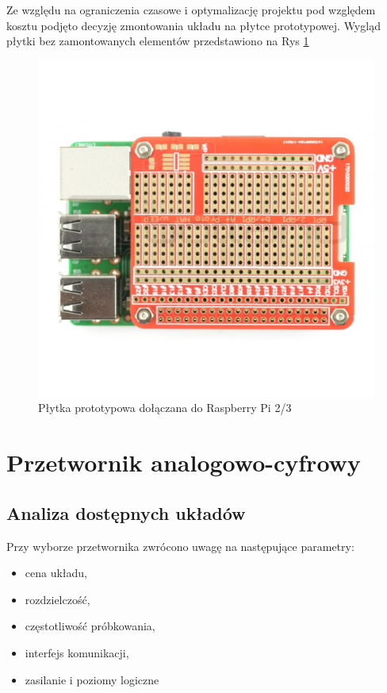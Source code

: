 Ze względu na ograniczenia czasowe i optymalizację projektu pod względem kosztu podjęto decyzję zmontowania układu na płytce prototypowej. Wygląd płytki bez zamontowanych elementów przedstawiono na Rys \ref{fig:rpihat}

\begin{figure}[h]
	\centering
		\includegraphics[width=12cm]{rpihat}
	\caption{Płytka prototypowa dołączana do Raspberry Pi 2/3} 
	\label{fig:rpihat}
\end{figure}


\section{Przetwornik analogowo-cyfrowy}

\subsection{Analiza dostępnych układów}
Przy wyborze przetwornika zwrócono uwagę na następujące parametry:
\begin{itemize}
\item cena układu, 
\item rozdzielczość, 
\item częstotliwość próbkowania,
\item interfejs komunikacji,
\item zasilanie i poziomy logiczne
\end{itemize}

